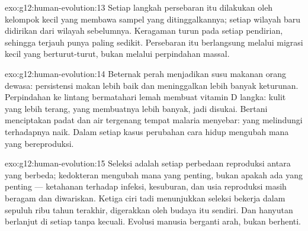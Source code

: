 \begin{solution}{exo:g12:human-evolution:13}
Setiap langkah persebaran itu dilakukan oleh kelompok kecil yang
membawa sampel   yang ditinggalkannya; setiap wilayah baru
didirikan dari wilayah sebelumnya. Keragaman turun pada setiap
pendirian, sehingga  terjauh punya paling sedikit. Persebaran
itu berlangsung melalui migrasi kecil yang berturut-turut, bukan
melalui perpindahan massal.
\end{solution}

\begin{solution}{exo:g12:human-evolution:14}
Beternak perah menjadikan susu makanan orang dewasa:  
persistensi makan lebih baik dan meninggalkan lebih banyak keturunan.
Perpindahan ke lintang bermatahari lemah membuat vitamin D langka:
kulit yang lebih terang, yang membuatnya lebih banyak, jadi disukai.
Bertani menciptakan  padat dan air tergenang tempat malaria
menyebar:  yang melindungi terhadapnya naik. Dalam setiap kasus
perubahan cara hidup mengubah  mana yang bereproduksi.
\end{solution}

\begin{solution}{exo:g12:human-evolution:15}
Seleksi adalah setiap perbedaan reproduksi antara   yang
berbeda; kedokteran mengubah  mana yang penting, bukan apakah ada
 yang penting --- ketahanan terhadap infeksi, kesuburan, dan usia
reproduksi masih beragam dan diwariskan. Ketiga ciri tadi menunjukkan
seleksi bekerja dalam sepuluh ribu tahun terakhir, digerakkan oleh
budaya itu sendiri. Dan hanyutan berlanjut di setiap  tanpa
kecuali. Evolusi manusia berganti arah, bukan berhenti.
\end{solution}

